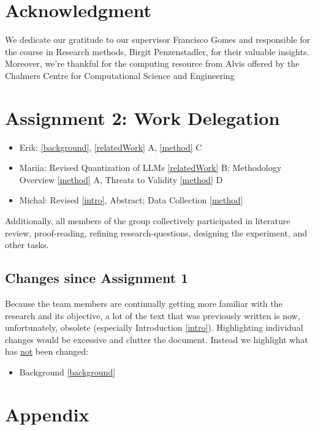 \documentclass[conference]{IEEEtran}
\begin{document}
\section*{Acknowledgment}
We dedicate our gratitude to our supervisor Francisco Gomes and responsible for
the course in Research methods, Birgit Penzenstadler, for their valuable
insights. Moreover, we're thankful for the computing resource from Alvis offered
by the Chalmers Centre for Computational Science and Engineering 

\section*{Assignment 2: Work Delegation}

\begin{itemize}
    \item Erik: \ref{background}, \ref{relatedWork} A, \ref{method} C
    \item Mariia: Revised Quantization of LLMs \ref{relatedWork} B; Methodology Overview \ref{method} A, Threats to Validity \ref{method} D 
    \item Michal: Revised \ref{intro}, Abstract; Data Collection \ref{method}
\end{itemize}

\noindent
Additionally, all members of the group collectively participated in literature
review, proof-reading, refining research-questions, designing the experiment, and other tasks.

\subsection*{Changes since Assignment 1}

\noindent
Because the team members are continually getting more familiar with the research
and its objective, a lot of the text that was previously written is now,
unfortunately, obsolete (especially Introduction \ref{intro}). Highlighting
individual changes would be excessive and clutter the document. Instead we
highlight what has \underline{not} been changed:

\begin{itemize}
    \item Background \ref{background}
\end{itemize}







\section*{Appendix}\label{appendix}
\end{document}
